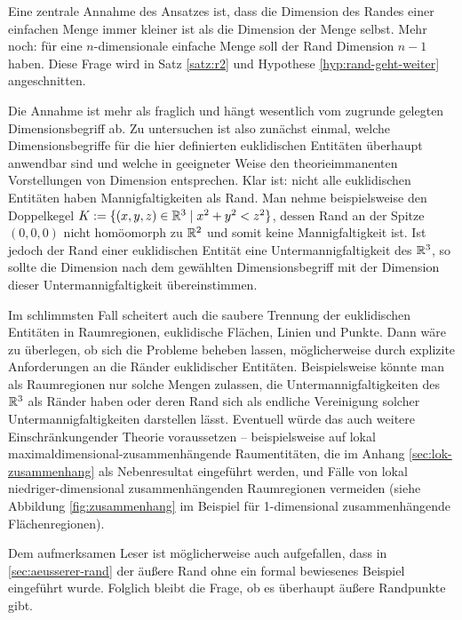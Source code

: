     Eine
    zentrale Annahme des Ansatzes ist, dass die Dimension des Randes einer einfachen Menge immer kleiner ist als die Dimension der Menge selbst. Mehr noch: für eine $n$-dimensionale einfache Menge soll der Rand Dimension $n-1$ haben.
    Diese Frage wird in Satz \ref{satz:r2} und Hypothese \ref{hyp:rand-geht-weiter} 
    angeschnitten.

    Die
    Annahme ist mehr als fraglich und hängt wesentlich vom zugrunde gelegten Dimensionsbegriff ab.
    Zu untersuchen ist also zunächst einmal, welche Dimensionsbegriffe für die hier definierten euklidischen Entitäten überhaupt anwendbar sind und welche in geeigneter Weise den theorieimmanenten Vorstellungen von Dimension entsprechen.
    Klar ist: nicht alle euklidischen Entitäten haben Mannigfaltigkeiten als Rand.
    Man nehme beispielsweise den Doppelkegel $K := \{(x,y,z) \in \mathbb{R}^3 \mid x^2+y^2 < z^2\}$, dessen Rand an der Spitze $(0,0,0)$ nicht homöomorph zu $\mathbb{R}^2$ und somit keine Mannigfaltigkeit ist.
    Ist jedoch der Rand einer euklidischen Entität eine Untermannigfaltigkeit des $\mathbb{R}^3$, so sollte die Dimension nach dem gewählten Dimensionsbegriff mit der Dimension dieser Untermannigfaltigkeit übereinstimmen.
    
    Im
    schlimmsten Fall scheitert auch die saubere Trennung der euklidischen Entitäten in Raumregionen, euklidische Flächen, Linien und Punkte.
    Dann wäre zu überlegen, ob sich die Probleme beheben lassen, möglicherweise durch explizite Anforderungen an die Ränder euklidischer Entitäten. 
    Beispielsweise könnte man als Raumregionen nur solche Mengen zulassen, die Untermannigfaltigkeiten des $\mathbb{R}^3$ als Ränder haben oder deren Rand sich als endliche Vereinigung solcher Untermannigfaltigkeiten darstellen lässt.
    Eventuell würde das auch weitere Einschränkungender Theorie voraussetzen -- beispielsweise auf lokal maximaldimensional-zusammenhängende Raumentitäten, die im Anhang \ref{sec:lok-zusammenhang} als Nebenresultat eingeführt werden, und Fälle von lokal niedriger-dimensional zusammenhängenden Raumregionen vermeiden (siehe Abbildung \ref{fig:zusammenhang} im Beispiel für 1-dimensional zusammenhängende Flächenregionen).
    
    Dem
    aufmerksamen Leser ist möglicherweise auch aufgefallen, dass in \ref{sec:aeusserer-rand} der äußere Rand ohne ein formal bewiesenes Beispiel eingeführt wurde.
    Folglich bleibt die Frage, ob es überhaupt äußere Randpunkte gibt.
    
